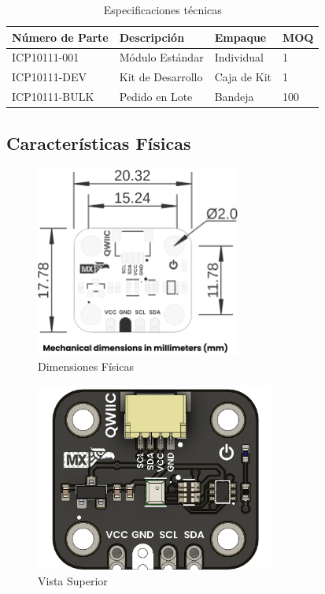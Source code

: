 \documentclass[11pt,a4paper]{article}
\begin{document}
\begin{table}[H]
\centering
\small
\begin{tabular}{|l|l|l|l|}
\hline
Número de Parte & Descripción & Empaque & MOQ \\
\hline
ICP10111-001 & Módulo Estándar & Individual & 1 \\
ICP10111-DEV & Kit de Desarrollo & Caja de Kit & 1 \\
ICP10111-BULK & Pedido en Lote & Bandeja & 100 \\
\hline
\end{tabular}
\caption{Especificaciones técnicas}
\end{table}


\subsection{Características Físicas}


\begin{figure}[H]
\centering
\includegraphics[width=0.6\textwidth]{es_unit_dimension_v_1_0_0_icp10111_barometric_pressure_sensor.png}
\caption{Dimensiones Físicas}
\label{fig:es-unit-dimension-v-1-0-0-icp10111-barometric-pressure-sensor-png}
\end{figure}




\begin{figure}[H]
\centering
\includegraphics[width=0.7\textwidth]{es_unit_top_v_1_0_0_icp10111_barometric_pressure_sensor.png}
\caption{Vista Superior}
\label{fig:es-unit-top-v-1-0-0-icp10111-barometric-pressure-sensor-png}
\end{figure}
\end{document}

